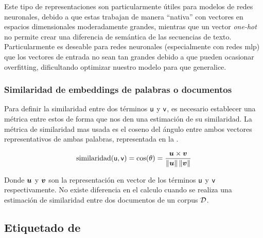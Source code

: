 Este tipo de representaciones son particularmente útiles para modelos de redes neuronales, debido a que estas trabajan de manera ``nativa'' con vectores en espacios dimensionales moderadamente grandes, mientras que un vector \emph{one-hot} no permite crear una diferencia de semántica de las secuencias de texto. Particularmente es deseable para redes neuronales (especialmente con redes \gls{mlp}) que los vectores de entrada no sean tan grandes debido a que pueden ocasionar \gls{overfitting}, dificultando optimizar nuestro modelo para que generalice.

\subsubsection{Similaridad de embeddings de palabras o documentos}
Para definir la similaridad entre dos términos ${\mathit{\mathsf{u}}}$ y ${\mathit{\mathsf{v}}}$, es necesario establecer una métrica entre estos de forma que nos den una estimación de su similaridad. La métrica de similaridad mas usada es el coseno del ángulo entre ambos vectores representativos de ambas palabras, representada en la .

\begin{equation} \label{eq:cosine-similarity-estimate}
  \mathrm{similaridad}({\mathit{\mathsf{u}}}, {\mathit{\mathsf{v}}}) = \cos(\theta) = \frac{{\bm{u}} \times {\bm{v}}}{\left\lVert{\bm{u}}\right\rVert \left\lVert{\bm{v}}\right\rVert}
\end{equation}

Donde ${\bm{u}}$ y ${\bm{v}}$ son la representación en vector de los términos ${\mathit{\mathsf{u}}}$ y ${\mathit{\mathsf{v}}}$ respectivamente. No existe diferencia en el calculo cuando se realiza una estimación de similaridad entre dos documentos de un \gls{corpus} $\mathcal{D}$.


\subsection{Etiquetado de }


\subsection{}
